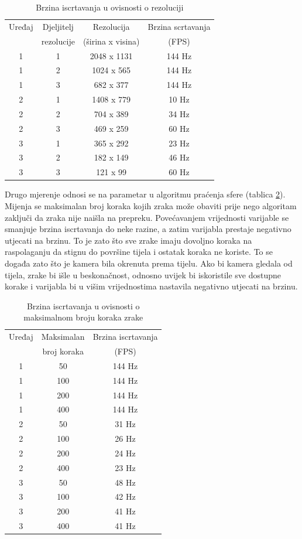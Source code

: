\documentclass[zavrsnirad, upload]{fer}
\begin{document}
\newpage{}

\begin{table}[htb]
	\centering
	\caption{Brzina iscrtavanja u ovisnosti o rezoluciji}
	\label{tab:fps_resolution}
	\begin{tabular}{|c|c|c|c|}
		\hline
		Uređaj & Djeljitelj & Rezolucija & Brzina scrtavanja \\
		 & rezolucije & (širina x visina) & (FPS) \\
		\hline
		1 & 1 & 2048 x 1131 & 144 Hz \\
		1 & 2 & 1024 x 565 & 144 Hz \\
		1 & 3 & 682 x 377 & 144 Hz \\
		\hline
		2 & 1 & 1408 x 779 & 10 Hz \\
		2 & 2 & 704 x 389 & 34 Hz\\
		2 & 3 & 469 x 259 & 60 Hz \\
		\hline
		3 & 1 & 365 x 292 & 23 Hz \\
		3 & 2 & 182 x 149 & 46 Hz \\
		3 & 3 & 121 x 99 & 60 Hz \\
		\hline
	\end{tabular}
\end{table}

Drugo mjerenje odnosi se na parametar u algoritmu praćenja sfere (tablica \ref{tab:fps_maxmarches}). Mijenja se maksimalan broj koraka kojih zraka može obaviti prije nego algoritam zaključi da zraka nije naišla na prepreku. Povećavanjem vrijednosti varijable se smanjuje brzina iscrtavanja do neke razine, a zatim varijabla prestaje negativno utjecati na brzinu. To je zato što sve zrake imaju dovoljno koraka na raspolaganju da stignu do površine tijela i ostatak koraka ne koriste. To se događa zato što je kamera bila okrenuta prema tijelu. Ako bi kamera gledala od tijela, zrake bi išle u beskonačnost, odnosno uvijek bi iskoristile sve dostupne korake i varijabla bi u višim vrijednostima nastavila negativno utjecati na brzinu.

\begin{table}[htb]
	\centering
	\caption{Brzina iscrtavanja u ovisnosti o maksimalnom broju koraka zrake}
	\label{tab:fps_maxmarches}
	\begin{tabular}{|c|c|c|}
		\hline
		Uređaj & Maksimalan & Brzina iscrtavanja \\
		& broj koraka & (FPS) \\
		\hline
		1 & 50 & 144 Hz\\
		1 & 100 & 144 Hz\\
		1 & 200 & 144 Hz\\
		1 & 400 & 144 Hz\\
		\hline
		2 & 50 & 31 Hz \\
		2 & 100 & 26 Hz \\
		2 & 200 & 24 Hz \\
		2 & 400 & 23 Hz \\
		\hline
		3 & 50 & 48 Hz \\
		3 & 100 & 42 Hz \\
		3 & 200 & 41 Hz \\
		3 & 400 & 41 Hz \\
		\hline
	\end{tabular}
\end{table}
\end{document}
